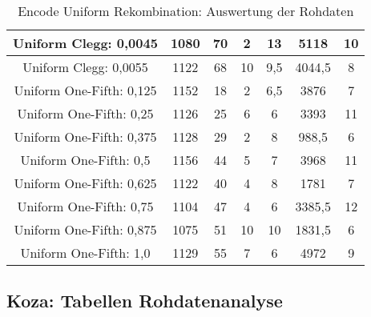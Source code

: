 \begin{table}[H]
\begin{tabular}{c | c | c | c | c | c | c}
		\hline
		Uniform Clegg: 0,0045 & 1080 & 70 & 2 & 13 & 5118 & 10\\
		\hline
		Uniform Clegg: 0,0055 & 1122 & 68 & 10 & 9,5 & 4044,5 & 8\\
		\hline
		Uniform One-Fifth: 0,125 & 1152 & 18 & 2 & 6,5 & 3876 & 7\\
		\hline
		Uniform One-Fifth: 0,25 & 1126 & 25 & 6 & 6 & 3393 & 11\\
		\hline
		Uniform One-Fifth: 0,375 & 1128 & 29 & 2 & 8 & 988,5 & 6\\
		\hline
		Uniform One-Fifth: 0,5 & 1156 & 44 & 5 & 7 & 3968 & 11\\
		\hline
		Uniform One-Fifth: 0,625 & 1122 & 40 & 4 & 8 & 1781 & 7\\
		\hline
		Uniform One-Fifth: 0,75 & 1104 & 47 & 4 & 6 & 3385,5 & 12\\
		\hline
		Uniform One-Fifth: 0,875 & 1075 & 51 & 10 & 10 & 1831,5 & 6\\
		\hline
		Uniform One-Fifth: 1,0 & 1129 & 55 & 7 & 6 & 4972 & 9\\
	\end{tabular}
	\caption{Encode Uniform Rekombination: Auswertung der Rohdaten}
	\label{table:encodeUniformRohdaten}
\end{table}

\subsection{Koza: Tabellen Rohdatenanalyse}
\label{subsec:appendixTabellenRohdatenanalyseKoza}

